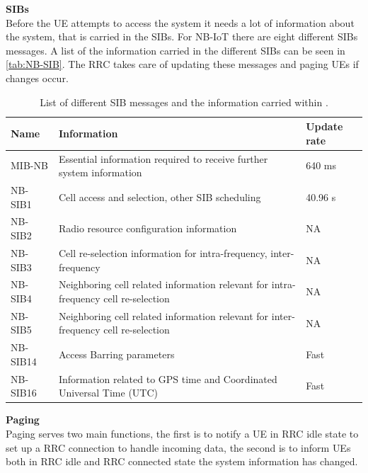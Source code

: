 \textbf{\gls{SIB}s}\\
Before the \gls{UE} attempts to access the system it needs a lot of information about the system, that is carried in the \gls{SIB}s. For \gls{NB-IoT} there are eight different \gls{SIB}s messages. A list of the information carried in the different \gls{SIB}s can be seen in  \autoref{tab:NB-SIB}. The \gls{RRC} takes care of updating these messages and paging \gls{UE}s if changes occur.

\begin{table}[H]
\centering
\begin{tabular}{|p{3cm}|p{8cm}|p{3cm}|}\hline
\textbf{Name}		& \textbf{Information}																	& \textbf{Update rate}	\\\hline
\raggedright\arraybackslash\gls{MIB-NB}		& Essential information required to receive further system information 					& 640 ms				\\\hline
\raggedright\arraybackslash\gls{NB-SIB}1		& Cell access and selection, other SIB scheduling 										& 40.96 s 				\\\hline
\gls{NB-SIB}2		& Radio resource configuration information 												& NA 					\\\hline
\gls{NB-SIB}3		& Cell re-selection information for intra-frequency, inter-frequency 					& NA 					\\\hline
\gls{NB-SIB}4		& Neighboring cell related information relevant for intra-frequency cell re-selection 	& NA 					\\\hline
\gls{NB-SIB}5		& Neighboring cell related information relevant for inter-frequency cell re-selection 	& NA 					\\\hline
\gls{NB-SIB}14		& Access Barring parameters 															& Fast 					\\\hline
\gls{NB-SIB}16		& Information related to GPS time and Coordinated Universal Time (UTC) 					& Fast 					\\\hline
\end{tabular}
\caption{List of different \gls{SIB} messages and the information carried within \citep{whitepaper,REL-13}.}
\label{tab:NB-SIB}
\end{table}

\textbf{Paging} \\
Paging serves two main functions, the first is to notify a \gls{UE} in \gls{RRC} idle state to set up a \gls{RRC} connection to handle incoming data, the second is to inform \gls{UE}s both in \gls{RRC} idle and  \gls{RRC} connected state the system information has changed. \citep[ch. 7]{NB-IoT_Book}

